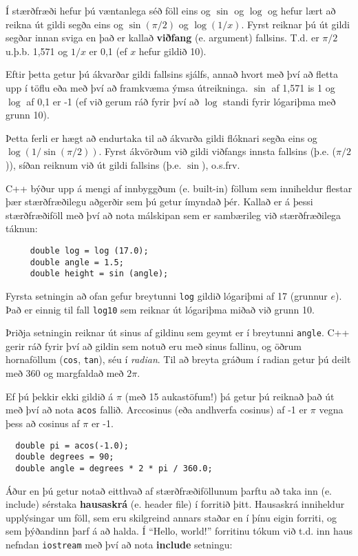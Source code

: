 Í stærðfræði hefur þú væntanlega séð föll eins og $\sin$ og $\log$ og hefur lært að reikna út gildi segða eins og $\sin(\pi/2)$ og $\log(1/x)$.
Fyrst reiknar þú út gildi segðar innan sviga en það er kallað {\bf viðfang} (e. argument) fallsins.
T.d. er $\pi/2$ u.þ.b. 1,571 og $1/x$ er 0,1 (ef $x$ hefur gildið 10).

Eftir þetta getur þú ákvarðar gildi fallsins sjálfs, annað hvort með því að fletta upp í töflu eða með því að framkvæma ýmsa útreikninga.
$\sin$ af 1,571 is 1 og $\log$ af 0,1 er -1 (ef við gerum ráð fyrir því að $\log$ standi fyrir 
lógariþma með grunn 10).

Þetta ferli er hægt að endurtaka til að ákvarða gildi flóknari segða eins og $\log(1/\sin(\pi/2))$.
Fyrst ákvörðum við gildi viðfangs innsta fallsins (þ.e. ($\pi/2$)), síðan reiknum við út gildi fallsins (þ.e. $\sin$), o.s.frv.

C++ býður upp á mengi af innbyggðum (e. built-in) föllum sem inniheldur flestar þær stærðfræðilegu aðgerðir sem þú getur ímyndað þér.
Kallað er á þessi stærðfræðiföll með því að nota málskipan sem er sambærileg við stærðfræðilega táknun: 

\begin{verbatim}
     double log = log (17.0);
     double angle = 1.5;
     double height = sin (angle);
\end{verbatim}
%

Fyrsta setningin að ofan gefur breytunni {\tt log} gildið lógariþmi af 17 (grunnur $e$).
Það er einnig til fall {\tt log10} sem reiknar út lógariþma miðað við grunn 10.

Þriðja setningin reiknar út sinus af gildinu sem geymt er í breytunni {\tt angle}.
C++ gerir ráð fyrir því að gildin sem notuð eru með sinus fallinu, og öðrum hornaföllum ({\tt cos}, {\tt tan}), séu í {\em radian}.
Til að breyta gráðum í radian getur þú deilt með 360 og margfaldað með $2 \pi$.  

Ef þú þekkir ekki gildið á $\pi$ (með 15 aukastöfum!) þá getur þú reiknað það út með því að nota {\tt acos} fallið.
Arccosinus (eða andhverfa cosinus) af -1 er $\pi$ vegna þess að cosinus af $\pi$ er -1.

\begin{verbatim}
  double pi = acos(-1.0);
  double degrees = 90;
  double angle = degrees * 2 * pi / 360.0;
\end{verbatim}
%
Áður en þú getur notað eitthvað af stærðfræðiföllunum þarftu að taka inn (e. include) sérstaka {\bf hausaskrá} (e. header file) í forritið þitt.
Hausaskrá inniheldur upplýsingar um föll, sem eru skilgreind annars staðar en í þínu eigin forriti, og sem þýðandinn þarf á að halda.
Í ``Hello, world!'' forritinu tókum við t.d. inn haus nefndan {\tt iostream} með því að nota {\bf include} setningu:

